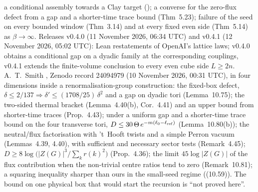 \documentclass[11pt,a4paper]{article}
\theoremstyle{plain}
\theoremstyle{definition}
\theoremstyle{remark}
\numberwithin{equation}{section}
\begin{document}
a conditional assembly towards a Clay target (); a converse for the zero-flux defect from a gap and a shorter-time trace bound (Thm~5.23); failure of the seed on every bounded window (Thm~3.14) and at every fixed even side (Thm~5.14) as $\beta\to\infty$. Releases v0.4.0 (11 November 2026, 06:34 UTC) and v0.4.1 (12 November 2026, 05:02 UTC): Lean restatements of OpenAI's lattice laws; v0.4.0 obtains a conditional gap on a dyadic family at the corresponding couplings, v0.4.1 extends the finite-volume conclusion to every even cube side $L\ge2n$.
 A.~T.~Smith \cite{Smi26}, Zenodo record 24094979 (10 November 2026, 00:31 UTC), in four dimensions inside a renormalisation-group construction: the fixed-box defect, $\delta\le2/137\Rightarrow\delta'\le(1708/25)\,\delta^2$ and a gap on dyadic tori (Lemma~10.75); the two-sided thermal bracket (Lemma~4.40(b), Cor.~4.41) and an upper bound from shorter-time traces (Prop.~4.43);
under a uniform gap and a shorter-time trace bound on the four transverse tori, $D\le30\,\Theta\,e^{-m(\ell_0-\ell_{\rm ref})}$ (Lemma~10.80(b)); the neutral/flux factorisation with 't~Hooft twists and a simple Perron vacuum (Lemmas~4.39, 4.40), with sufficient and necessary sector tests (Remark~4.45); $D\ge8\log\bigl(|Z(G)|^3/\sum_kr(k)^2\bigr)$ (Prop.~4.36); the limit $45\log|Z(G)|$ of the flux contribution when the non-trivial centre ratios tend to zero (Remark~10.81); a squaring inequality sharper than ours in the small-seed regime ((10.59)). The bound on one physical box that would start the recursion is ``not proved here''.
\end{document}
